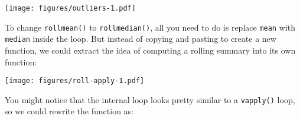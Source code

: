 \texttt{[image: figures/outliers-1.pdf]}

To change \texttt{rollmean()} to \texttt{rollmedian()}, all you need to
do is replace \texttt{mean} with \texttt{median} inside the loop. But
instead of copying and pasting to create a new function, we could
extract the idea of computing a rolling summary into its own function:

\begin{Shaded}
\begin{Highlighting}[]
\StringTok{ }
  \StringTok{ }\NormalTok{(}\NormalTok{, }

  \StringTok{ }\StringTok{ }\NormalTok{)}
  \StringTok{ }\NormalTok{):(}\StringTok{ }\StringTok{ }\StringTok{ }\NormalTok{)) \{}
    \StringTok{ }\NormalTok{(x[(i -}\StringTok{ }\StringTok{ }\NormalTok{offset)], ...)}
  \NormalTok{\}}
\NormalTok{\}}
\NormalTok{(} \NormalTok{, } \NormalTok{)}
\end{Highlighting}
\end{Shaded}

\texttt{[image: figures/roll-apply-1.pdf]}

You might notice that the internal loop looks pretty similar to a
\texttt{vapply()} loop, so we could rewrite the function as:

\begin{Shaded}
\begin{Highlighting}[]
\StringTok{ }
  \StringTok{ }\StringTok{ }\NormalTok{)}
  \StringTok{ }\StringTok{ }\NormalTok{):(}\StringTok{ }\StringTok{ }\StringTok{ }\NormalTok{)}
  \StringTok{ }\NormalTok{(}
    \NormalTok{(x[(i -}\StringTok{ }\StringTok{ }\NormalTok{offset)], ...),}
    \NormalTok{(}\NormalTok{)}
  \NormalTok{)}

  \NormalTok{(}\NormalTok{(}
\NormalTok{\}}
\end{Highlighting}
\end{Shaded}

